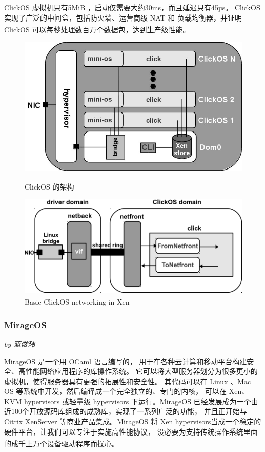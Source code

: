 \documentclass[UTF8,fontset=none,linespread=1.15]{ctexart}
\let\nosupcite\cite
\renewcommand*{\cite}[1]{\textsuperscript{\nosupcite{#1}}}
\newcommand{\sectionauthor}[1]{%
\vspace*{-5ex}
\noindent\textrm{\hfill\textit{by #1}}
\vspace*{2ex}\par}
\begin{document}
ClickOS 虚拟机只有5MiB ，启动仅需要大约30ms，而且延迟只有45µs。
ClickOS 实现了广泛的中间盒，包括防火墙、运营商级 NAT 和
负载均衡器，并证明 ClickOS 可以每秒处理数百万个数据包，达到生产级性能。\cite{bib:12-clickos}\cite{bib:13-clickos2}

\begin{figure}[!hbt]
\begin{minipage}{0.49\linewidth}
\includegraphics[width=\linewidth]{pictures/clickOS_arch.jpg}
\caption{ClickOS 的架构\cite{bib:13-clickos2}}
\end{minipage}
\begin{minipage}{0.49\linewidth}
\includegraphics[width=\linewidth]{pictures/ClickOS_networking.png}
\caption{Basic ClickOS networking in Xen\cite{bib:12-clickos}}
\end{minipage}
\end{figure}

\subsubsection{MirageOS}\sectionauthor{蓝俊玮}

MirageOS 是一个用 OCaml 语言编写的，
用于在各种云计算和移动平台构建安全、高性能网络应用程序的库操作系统。
它可以将大型服务器划分为很多更小的虚拟机，使得服务器具有更强的拓展性和安全性。
其代码可以在 Linux 、Mac OS 等系统中开发，然后编译成一个完全独立的、专门的内核，
可以在 Xen、KVM hypervisors 或轻量级 hypervisors 下运行。MirageOS
已经发展成为一个由近100个开放源码库组成的成熟库，实现了一系列广泛的功能，
并且正开始与 Citrix XenServer 等商业产品集成。MirageOS
将 Xen hypervisors当成一个稳定的硬件平台，让我们可以专注于实施高性能协议，
没必要为支持传统操作系统里面的成千上万个设备驱动程序而操心。\cite{bib:11-unikerel2}
\end{document}
